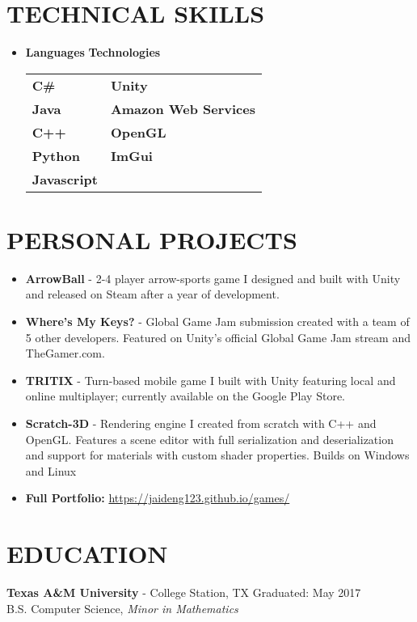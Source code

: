 \documentclass[margin,10pt]{res} %
\begin{document}
\begin{resume}
\section{TECHNICAL SKILLS}	
							\begin{itemize}
                    		\item[] 
\textbf{\large Languages}  \hspace*{.5in} \textbf{\large Technologies}        \\
\begin{tabular}{ll}
\textbf{C\#} \hspace*{1in}  & \textbf{Unity} \\
\textbf{Java} & \textbf{Amazon Web Services} \\
\textbf{C++}   & \textbf{OpenGL}       \\
\textbf{Python}  & \textbf{ImGui}               \\
\textbf{Javascript} &  \\                
\end{tabular}
                    		\end{itemize} 
\section{PERSONAL PROJECTS}
				\begin{itemize}       
				\item \textbf{ArrowBall} - 2-4 player arrow-sports game I designed and built with Unity and released on Steam after a year of development.
                	\item \textbf{Where's My Keys?} - Global Game Jam submission created with a team of 5 other developers. Featured on Unity's official Global Game Jam stream and TheGamer.com.
                	\item \textbf{TRITIX} - Turn-based mobile game I built with Unity featuring local and online multiplayer; currently available on the Google Play Store.
                	\item \textbf{Scratch-3D} - Rendering engine I created from scratch with C++ and OpenGL. Features a scene editor with full serialization and deserialization and support for materials with custom shader properties. Builds on Windows and Linux
                	\item \textbf{Full Portfolio:} \href{https://jaideng123.github.io/games/}{https://jaideng123.github.io/games/}
                \end{itemize}
                
\section{EDUCATION}
{\bf Texas A\&M University} - College Station, TX \hfill
Graduated: May 2017 \\
B.S. Computer Science,
\textit{Minor in Mathematics}
\end{resume} 
\end{document}
